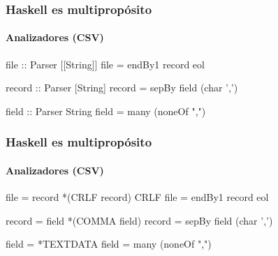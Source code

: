 \documentclass[spanish]{beamer}
\begin{document}

\begin{frame}[fragile]
  \frametitle{Haskell es multipropósito}
  \framesubtitle{Analizadores (CSV)}

  \begin{code}
file :: Parser [[String]]
file = endBy1 record eol

record :: Parser [String]
record = sepBy field (char ',')

field :: Parser String
field = many (noneOf ",\n")
  \end{code}
\end{frame}


\begin{frame}[fragile]
  \frametitle{Haskell es multipropósito}
  \framesubtitle{Analizadores (CSV)}

  \begin{code}
file = record *(CRLF record) CRLF
file = endBy1 record eol

record = field *(COMMA field)
record = sepBy field (char ',')

field = *TEXTDATA
field = many (noneOf ",\n")
  \end{code}
\end{frame}

\end{document}
